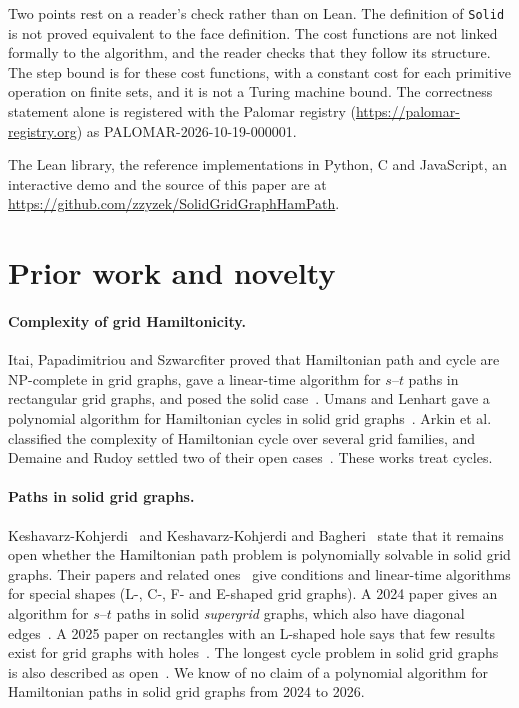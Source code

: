 \documentclass[11pt]{article}
\theoremstyle{plain}
\theoremstyle{definition}
\theoremstyle{remark}
\newcommand{\lean}[1]{\texttt{#1}}
\begin{document}
Two points rest on a reader's check rather than on Lean.
The definition of \lean{Solid} is not proved equivalent to the face definition.
The cost functions are not linked formally to the algorithm, and the reader checks that they follow
its structure.
The step bound is for these cost functions, with a constant cost for each primitive operation on
finite sets, and it is not a Turing machine bound.
The correctness statement alone is registered with the Palomar registry
(\url{https://palomar-registry.org}) as PALOMAR-2026-10-19-000001.

The Lean library, the reference implementations in Python, C and JavaScript, an interactive demo
and the source of this paper are at \url{https://github.com/zzyzek/SolidGridGraphHamPath}.

\appendix

\section{Prior work and novelty}
\label{app:prior}

\paragraph{Complexity of grid Hamiltonicity.}
Itai, Papadimitriou and Szwarcfiter proved that Hamiltonian path and cycle are NP-complete in grid
graphs, gave a linear-time algorithm for $s$--$t$ paths in rectangular grid graphs, and posed the
solid case~\cite{itai1982}.
Umans and Lenhart gave a polynomial algorithm for Hamiltonian cycles in solid grid
graphs~\cite{umans1997}.
Arkin et al.~\cite{arkin2009} classified the complexity of Hamiltonian cycle over several grid
families, and Demaine and Rudoy settled two of their open cases~\cite{demaine2017}.
These works treat cycles.

\paragraph{Paths in solid grid graphs.}
Keshavarz-Kohjerdi~\cite{kk2011} and Keshavarz-Kohjerdi and Bagheri~\cite{kkb2016c} state that
it remains open whether the Hamiltonian path problem is polynomially solvable in solid grid
graphs.
Their papers and related ones~\cite{kkb2012,kkb2016l} give conditions and linear-time algorithms
for special shapes (L-, C-, F- and E-shaped grid graphs).
A 2024 paper gives an algorithm for $s$--$t$ paths in solid \emph{supergrid} graphs, which also have
diagonal edges~\cite{kkb2024}.
A 2025 paper on rectangles with an L-shaped hole says that few results exist for grid graphs with
holes~\cite{rouhani2025}.
The longest cycle problem in solid grid graphs is also described as open~\cite{sardroud2015}.
We know of no claim of a polynomial algorithm for Hamiltonian paths in solid grid graphs from 2024 to
2026.
\end{document}
